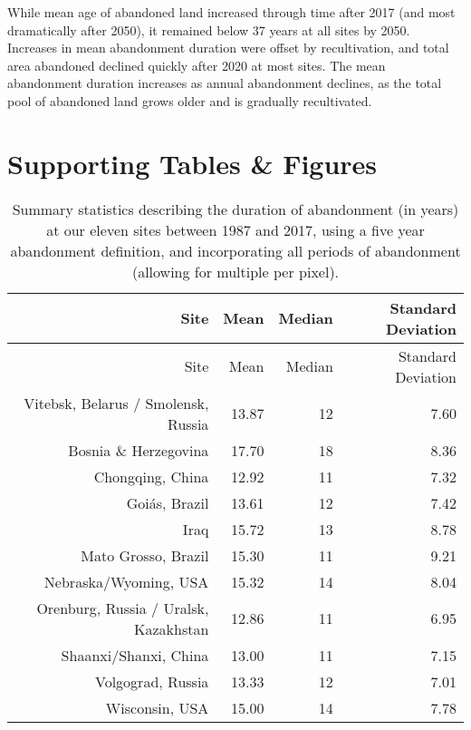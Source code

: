\documentclass[9pt,twocolumn,twoside,lineno]{pnas-new}
\begin{document}
While mean age of abandoned land increased through time after 2017 (and most dramatically after 2050), it remained below 37 years at all sites by 2050.
Increases in mean abandonment duration were offset by recultivation, and total area abandoned declined quickly after 2020 at most sites.
The mean abandonment duration increases as annual abandonment declines, as the total pool of abandoned land grows older and is gradually recultivated.

\newpage

\hypertarget{supporting-tables-figures}{%
\section{Supporting Tables \& Figures}\label{supporting-tables-figures}}

\begin{longtable}[]{@{}rrrr@{}}
\caption{\label{tab:summary-stats-table}Summary statistics describing the duration of abandonment (in years) at our eleven sites between 1987 and 2017, using a five year abandonment definition, and incorporating all periods of abandonment (allowing for multiple per pixel).}\tabularnewline
\toprule
Site & Mean & Median & Standard Deviation \\
\midrule
\endfirsthead
\toprule
Site & Mean & Median & Standard Deviation \\
\midrule
\endhead
Vitebsk, Belarus / Smolensk, Russia & 13.87 & 12 & 7.60 \\
Bosnia \& Herzegovina & 17.70 & 18 & 8.36 \\
Chongqing, China & 12.92 & 11 & 7.32 \\
Goiás, Brazil & 13.61 & 12 & 7.42 \\
Iraq & 15.72 & 13 & 8.78 \\
Mato Grosso, Brazil & 15.30 & 11 & 9.21 \\
Nebraska/Wyoming, USA & 15.32 & 14 & 8.04 \\
Orenburg, Russia / Uralsk, Kazakhstan & 12.86 & 11 & 6.95 \\
Shaanxi/Shanxi, China & 13.00 & 11 & 7.15 \\
Volgograd, Russia & 13.33 & 12 & 7.01 \\
Wisconsin, USA & 15.00 & 14 & 7.78 \\
\bottomrule
\end{longtable}
\end{document}
